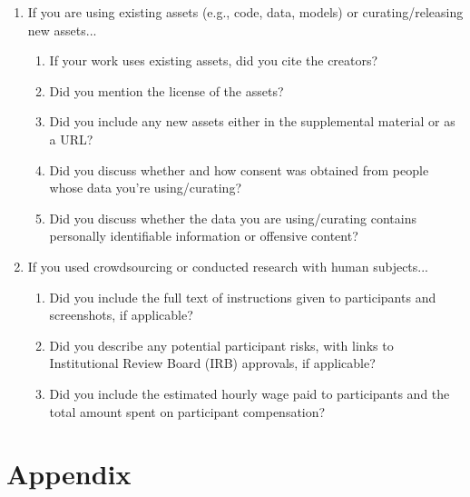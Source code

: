 \documentclass{article}
\begin{document}
\begin{enumerate}
\item If you are using existing assets (e.g., code, data, models) or curating/releasing new assets...
\begin{enumerate}
  \item If your work uses existing assets, did you cite the creators?
    \answerYes{\ref{sec:datasets}}
  \item Did you mention the license of the assets?
  \item Did you include any new assets either in the supplemental material or as a URL?
    \answerYes{\ref{sec:code}}
  \item Did you discuss whether and how consent was obtained from people whose data you're using/curating?
  \item Did you discuss whether the data you are using/curating contains personally identifiable information or offensive content?
\end{enumerate}

\item If you used crowdsourcing or conducted research with human subjects...
\begin{enumerate}
  \item Did you include the full text of instructions given to participants and screenshots, if applicable?
  \item Did you describe any potential participant risks, with links to Institutional Review Board (IRB) approvals, if applicable?
  \item Did you include the estimated hourly wage paid to participants and the total amount spent on participant compensation?
\end{enumerate}

\end{enumerate}


\appendix
\renewcommand{\thetable}{A\arabic{table}}
\renewcommand{\thefigure}{A\arabic{figure}}
\setcounter{table}{0}
\setcounter{figure}{0}
\section{Appendix}
\end{document}
